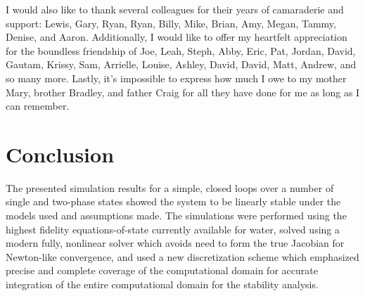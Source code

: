 \documentclass{UWMadThesis}
\begin{document}
I would also like to thank several colleagues for their years of camaraderie and support: Lewis, Gary, Ryan, Ryan, Billy, Mike, Brian, Amy, Megan, Tammy, Denise, and Aaron.
Additionally, I would like to offer my heartfelt appreciation for the boundless friendship of Joe, Leah, Steph, Abby, Eric, Pat, Jordan, David, Gautam, Krissy, Sam, Arrielle, Louise, Ashley, David, David, Matt, Andrew, and so many more.
Lastly, it's impossible to express how much I owe to my mother Mary, brother Bradley, and father Craig for all they have done for me as long as I can remember.









    \TableOfContents
    \ListOfTables
    \ListOfFigures

    \begin{Acronym}
    \end{Acronym}







\chapter{Conclusion}
The presented simulation results for a simple, closed loops over a number of single and two-phase states showed the system to be linearly stable under the models used and assumptions made.
The simulations were performed using the highest fidelity equations-of-state currently available for water, solved using a modern fully, nonlinear solver which avoids need to form the true Jacobian for Newton-like convergence, and used a new  discretization scheme which emphasized precise and complete coverage of the computational domain for accurate integration of the entire computational domain for the stability analysis.
\end{document}
